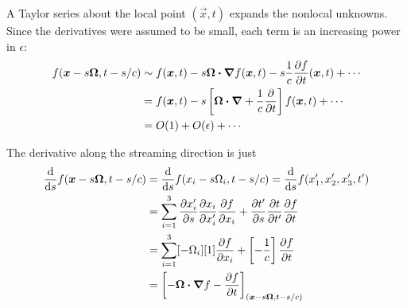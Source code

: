 A Taylor series about the local point $(\vec{x}, t)$ expands the nonlocal
unknowns. Since the derivatives were assumed to be small, each term
is an increasing power in $\epsilon$:
\begin{align*}
  f(\bm{x} - s \bm{\Omega}, t-s/c)
  &\sim
  f(\bm{x}, t) - s \bm{\Omega} \bm{\cdot} \bm{\nabla} f(\bm{x}, t)
  - s\frac{1}{c} \frac{\partial f}{\partial t}(\bm{x}, t) + \cdots
  \\
  &= f(\bm{x}, t) - s \left[ \bm{\Omega} \bm{\cdot} \bm{\nabla}
  + \frac{1}{c} \frac{\partial }{\partial t} \right] f(\bm{x}, t) + \cdots
  \\
  &= O(1) +
  O(\epsilon) + \cdots
\end{align*}

The derivative along the streaming direction is just
\begin{align*}
  \frac{\mathrm{d} }{\mathrm{d} s} f(\bm{x} - s \bm{\Omega}, t-s/c)
  &=  \frac{\mathrm{d} }{\mathrm{d} s} f(x_i - s \Omega_i, t-s/c)
  = \frac{\mathrm{d} }{\mathrm{d} s} f(x_1',x_2',x_3',t')
  \\
  &= \sum_{i=1}^{3}
  \frac{\partial x_i'}{\partial s}\frac{\partial x_i}{\partial x_i'} \frac{\partial f}{\partial x_i}
  + \frac{\partial t'}{\partial s}\frac{\partial t}{\partial t'} \frac{\partial f}{\partial t}
  \\
  &= \sum_{i=1}^{3} [- \Omega_i][1]\frac{\partial f}{\partial x_i} 
  + \left[ -\frac{1}{c} \right]  \frac{\partial f}{\partial t}
  \\
  &= \left[ -\bm{\Omega} \bm{\cdot} \bm{\nabla} f - \frac{\partial f}{\partial t} \right]_{(\bm{x} - s
  \bm{\Omega}, t-s/c)}
\end{align*}


